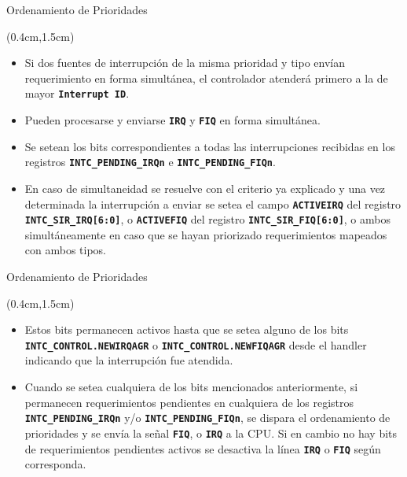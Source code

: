 \documentclass[usenames,table,xcolor={x11names},aspectratio=169]{beamer}
\begin{document}
\begin{frame}[t]{Ordenamiento de Prioridades}
 \begin{textblock*}{\textwidth}(0.4cm,1.5cm)
  \begin{itemize}[<+(1)->]\justifying \parskip 0.18cm
   \item Si dos fuentes de interrupción de la misma prioridad y tipo envían requerimiento en forma simultánea, el controlador atenderá primero a la de mayor \texttt{\textbf{Interrupt ID}}.
   \item Pueden procesarse y enviarse \textbf{\texttt{IRQ}} y \texttt{\textbf{FIQ}} en forma simultánea.
   \item Se setean los bits correspondientes a todas las interrupciones recibidas en los registros \textbf{\texttt{INTC\_PENDING\_IRQn}} e \textbf{\texttt{INTC\_PENDING\_FIQn}}.
   \item En caso de simultaneidad se resuelve con el criterio ya explicado y una vez determinada la interrupción a enviar se setea el campo \textbf{\texttt{ACTIVEIRQ}} del registro \texttt{\textbf{INTC\_SIR\_IRQ[6:0]}}, o \textbf{\texttt{ACTIVEFIQ}} del registro \texttt{\textbf{INTC\_SIR\_FIQ[6:0]}}, o ambos simultáneamente en caso que se hayan priorizado requerimientos mapeados con ambos tipos.
  \end{itemize}
 \end{textblock*}
\end{frame}   
   
\begin{frame}[t]{Ordenamiento de Prioridades}
 \begin{textblock*}{\textwidth}(0.4cm,1.5cm)
  \begin{itemize}[<+(1)->]\justifying \parskip 0.2cm
   \item Estos bits permanecen activos hasta que se setea alguno de los bits \textbf{\texttt{INTC\_CONTROL.NEWIRQAGR}} o \textbf{\texttt{INTC\_CONTROL.NEWFIQAGR}} desde el handler indicando que la interrupción fue atendida.
   \item Cuando se setea cualquiera de los bits mencionados anteriormente, si permanecen requerimientos pendientes en cualquiera de los registros \textbf{\texttt{INTC\_PENDING\_IRQn}} y/o \textbf{\texttt{INTC\_PENDING\_FIQn}}, se dispara el ordenamiento de prioridades y se envía la señal \textbf{\texttt{FIQ}}, o \textbf{\texttt{IRQ}} a la CPU. Si en cambio no hay bits de requerimientos pendientes activos se desactiva la línea \textbf{\texttt{IRQ}} o \textbf{\texttt{FIQ}} según corresponda.
  \end{itemize}
 \end{textblock*}
\end{frame}
\end{document}
